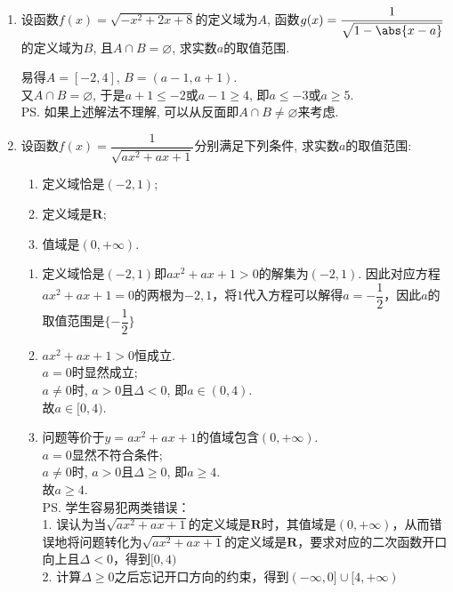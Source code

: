 \begin{enumerate}
\item 设函数$f(x)=\sqrt{-x^2+2x+8}$的定义域为$A$, 函数$g(x)=\dfrac{1}{\sqrt{1-\abs{x-a}}}$的定义域为$B$, 
且$A\cap B=\varnothing$, 求实数$a$的取值范围. 
\begin{jieda}
易得$A=[-2,4]$, $B=(a-1,a+1)$. \\
又$A\cap B=\varnothing$, 于是$a+1\leq-2$或$a-1\geq 4$, 即$a\leq-3$或$a\geq 5$. \\
\ps 如果上述解法不理解, 可以从反面即$A\cap B\neq\varnothing$来考虑. 
\end{jieda}
\begin{vspace_}
\vsp[7]
\end{vspace_}
\clearpage

\item 设函数$f(x)=\dfrac{1}{\sqrt{ax^2+ax+1}}$分别满足下列条件, 求实数$a$的取值范围: 
\begin{enumerate}
\item 定义域恰是$(-2,1)$; 
\item 定义域是$\mathbf{R}$; 
\item 值域是$(0,+\infty)$. 
\end{enumerate}
\begin{jieda}
\begin{enumerate}
    \item 定义域恰是$(-2,1)$即$ax^2+ax+1>0$的解集为$(-2,1)$. 因此对应方程$ax^2+ax+1=0$的两根为$-2, 1$，将$1$代入方程可以解得$a = -\dfrac{1}{2}$，因此$a$的取值范围是$\{-\dfrac{1}{2}\}$
    
    \item $ax^2+ax+1>0$恒成立. \\
    $a=0$时显然成立; \\
    $a\neq 0$时, $a>0$且$ \Delta<0$, 即$a\in(0,4)$. \\
    故$a\in[0,4)$. 
    
    \item 问题等价于$y=ax^2+ax+1$的值域包含$(0,+\infty)$. \\
    $a=0$显然不符合条件; \\
    $a\neq 0$时, $a>0$且$\Delta\geq0$, 即$a\geq 4$. \\
    故$a\geq 4$. \\
    \ps 学生容易犯两类错误：\\
        1. 误认为当$\sqrt{ax^2+ax+1}$的定义域是$\mathbf{R}$时，其值域是$(0, +\infty)$，从而错误地将问题转化为$\sqrt{ax^2+ax+1}$的定义域是$\mathbf{R}$，要求对应的二次函数开口向上且$\Delta < 0$，得到$[0, 4)$\\
        2. 计算$\Delta \geq 0$之后忘记开口方向的约束，得到$(-\infty, 0] \cup [4, +\infty)$
\end{enumerate}
\end{jieda}
\begin{vspace_}
\vsp[5]
\end{vspace_}


\end{enumerate}
